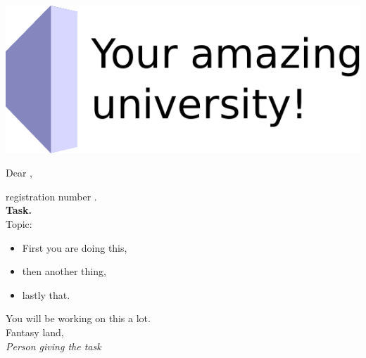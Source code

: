 \begin{center}
\makeatletter
\includegraphics[height=9ex]{./images/logos/university_logo.pdf}

\vspace{1\baselineskip}

Dear \@author{},

registration number \@immnumber{}.\\[0.5\baselineskip]

\textbf{\@thesis{} Task.}\\[0.5\baselineskip]

Topic:

\bfseries\@title

\makeatother
\end{center}
{%
\kant[1-2]
\begin{itemize}
	\item First you are doing this,
	\item then another thing,
	\item lastly that.
\end{itemize}
}%
\vspace{\baselineskip}

\noindent You will be working on this a lot.\\[0.4\baselineskip]

\noindent Fantasy land, \\[2\baselineskip]%


\emph{Person giving the task}